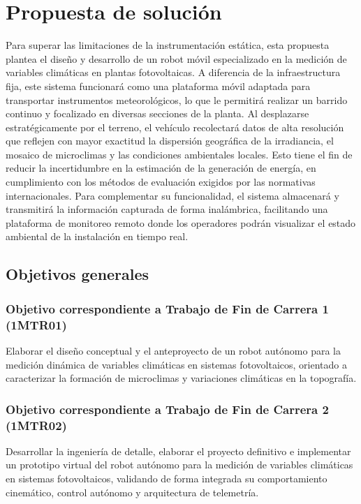 \documentclass[../../General.tex]{subfiles}
\begin{document}
\section{Propuesta de solución}

Para superar las limitaciones de la instrumentación estática, esta propuesta plantea el diseño y desarrollo de un robot móvil especializado en la medición de variables climáticas en plantas fotovoltaicas. A diferencia de la infraestructura fija, este sistema funcionará como una plataforma móvil adaptada para transportar instrumentos meteorológicos, lo que le permitirá realizar un barrido continuo y focalizado en diversas secciones de la planta. Al desplazarse estratégicamente por el terreno, el vehículo recolectará datos de alta resolución que reflejen con mayor exactitud la dispersión geográfica de la irradiancia, el mosaico de microclimas y las condiciones ambientales locales. Esto tiene el fin de reducir la incertidumbre en la estimación de la generación de energía, en cumplimiento con los métodos de evaluación exigidos por las normativas internacionales. Para complementar su funcionalidad, el sistema almacenará y transmitirá la información capturada de forma inalámbrica, facilitando una plataforma de monitoreo remoto donde los operadores podrán visualizar el estado ambiental de la instalación en tiempo real.


\subsection{Objetivos generales}

\subsubsection{Objetivo correspondiente a Trabajo de Fin de Carrera 1 (1MTR01)}
Elaborar el diseño conceptual y el anteproyecto de un robot autónomo para la medición dinámica de variables climáticas en sistemas fotovoltaicos, orientado a caracterizar la formación de microclimas y variaciones climáticas en la topografía.

\subsubsection{Objetivo correspondiente a Trabajo de Fin de Carrera 2 (1MTR02)}
Desarrollar la ingeniería de detalle, elaborar el proyecto definitivo e implementar un prototipo virtual del robot autónomo para la medición de variables climáticas en sistemas fotovoltaicos, validando de forma integrada su comportamiento cinemático, control autónomo y arquitectura de telemetría.
\end{document}
